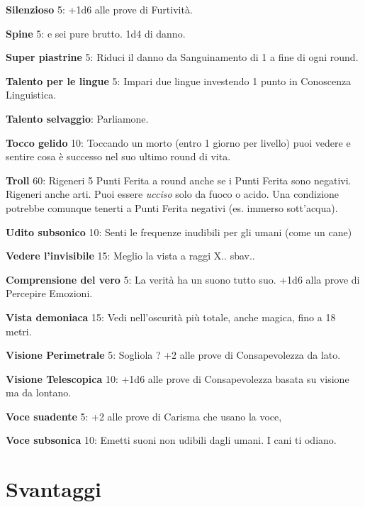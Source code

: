 \documentclass[a4paper,twoside,openany]{book}
\begin{document}
\begin{multicols}{2}
\textbf{Silenzioso} 5: +1d6 alle prove di Furtività.

\textbf{Spine} 5: e sei pure brutto. 1d4 di danno.

\textbf{Super piastrine} 5: Riduci il danno da Sanguinamento di 1 a fine di ogni round.

\textbf{Talento per le lingue} 5: Impari due lingue investendo 1 punto in Conoscenza Linguistica.

\textbf{Talento selvaggio}: Parliamone.

\textbf{Tocco gelido} 10: Toccando un morto (entro 1 giorno per livello) puoi vedere e sentire cosa è successo nel suo ultimo round di vita.

\textbf{Troll} 60: Rigeneri 5 Punti Ferita a round anche se i Punti Ferita sono negativi. Rigeneri anche arti. Puoi essere \emph{ucciso} solo da fuoco o acido. Una condizione potrebbe comunque tenerti a Punti Ferita negativi (es. immerso sott'acqua).

\textbf{Udito subsonico} 10: Senti le frequenze inudibili per gli umani (come un cane)

\textbf{Vedere l'invisibile} 15: Meglio la vista a raggi X.. sbav..

\textbf{Comprensione del vero} 5: La verità ha un suono tutto suo. +1d6 alla prove di Percepire Emozioni.

\textbf{Vista demoniaca} 15: Vedi nell'oscurità più totale, anche magica, fino a 18 metri.

\textbf{Visione Perimetrale} 5: Sogliola ? +2 alle prove di Consapevolezza da lato.

\textbf{Visione Telescopica} 10: +1d6 alle prove di Consapevolezza basata su visione ma da lontano.

\textbf{Voce suadente} 5: +2 alle prove di Carisma che usano la voce,

\textbf{Voce subsonica} 10: Emetti suoni non udibili dagli umani. I cani ti odiano.

\end{multicols}

\pagebreak

\section{Svantaggi}
\end{document}
